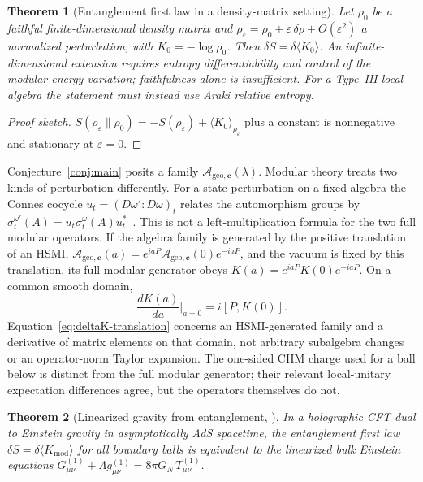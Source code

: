\documentclass[12pt,a4paper]{article}
\newtheorem{theorem}{Theorem}[section]
\begin{document}
\begin{theorem}[Entanglement first law in a density-matrix setting]
\label{thm:first-law}
Let $\rho_0$ be a faithful finite-dimensional density matrix and
$\rho_\varepsilon=\rho_0+\varepsilon\,\delta\rho+O(\varepsilon^2)$ a normalized
perturbation, with $K_0=-\log\rho_0$. Then $\delta S=\delta\langle K_0\rangle$.
An infinite-dimensional extension requires entropy differentiability and control
of the modular-energy variation; faithfulness alone is insufficient. For a Type~III
local algebra the statement must instead use Araki relative entropy.
\end{theorem}

\begin{proof}[Proof sketch]
$S(\rho_\varepsilon\|\rho_0)=-S(\rho_\varepsilon)+\langle K_0\rangle_{\rho_\varepsilon}$ plus a constant is nonnegative and stationary at $\varepsilon=0$.
\end{proof}

Conjecture~\ref{conj:main} posits a family $\mathcal{A}_{\mathrm{geo},\mathbf{c}}(\lambda)$. Modular theory treats two kinds of perturbation differently. For a state perturbation on a fixed algebra the Connes cocycle $u_t=(D\omega':D\omega)_t$ relates the automorphism groups by
$\sigma_t^{\omega'}(A)=u_t\sigma_t^\omega(A)u_t^*$~\cite{Connes1994,Takesaki2003}. This is not a left-multiplication formula for the two full modular operators. If the algebra family is generated by the positive translation of an HSMI,
$\mathcal A_{\mathrm{geo},\mathbf c}(a)=e^{iaP}\mathcal A_{\mathrm{geo},\mathbf c}(0)e^{-iaP}$,
and the vacuum is fixed by this translation, its full modular generator obeys
$K(a)=e^{iaP}K(0)e^{-iaP}$. On a common smooth domain,
\begin{equation}
\label{eq:deltaK-translation}
\frac{dK(a)}{da}\Big|_{a=0}=i[P,K(0)] .
\end{equation}
Equation~\eqref{eq:deltaK-translation} concerns an HSMI-generated family and a derivative
of matrix elements on that domain, not arbitrary subalgebra changes or an operator-norm
Taylor expansion. The one-sided CHM charge used for a ball below is distinct from the
full modular generator; their relevant local-unitary expectation differences agree,
but the operators themselves do not.

\begin{theorem}[Linearized gravity from entanglement, {\cite{Faulkner2014}}]
\label{thm:linearized-Faulkner}
In a holographic CFT dual to Einstein gravity in asymptotically AdS spacetime, the entanglement first law $\delta S = \delta\langle K_{\mathrm{mod}}\rangle$ for all boundary balls is equivalent to the linearized bulk Einstein equations $G_{\mu\nu}^{(1)} + \Lambda g_{\mu\nu}^{(1)} = 8\pi G_N\, T_{\mu\nu}^{(1)}$.
\end{theorem}
\end{document}
